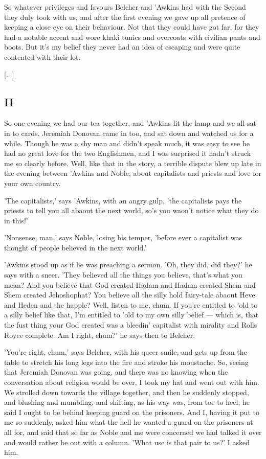 \documentclass[10pt,a4paper]{article}
\begin{document}
So whatever privileges and favours Belcher and 'Awkins had with the Second they duly took with us, and after the first evening we gave up all pretence of keeping a close eye on their behaviour. Not that they could have got far, for they had a notable accent and wore khaki tunics and overcoats with civilian pants and boots. But it's my belief they never had an idea of escaping and were quite contented with their lot. 

[...]

\subsection{II}

So one evening we had our tea together, and 'Awkins lit the lamp and we all sat in to cards. Jeremiah Donovan came in too, and sat down and watched us for a while. Though he was a shy man and didn't speak much, it was easy to see he had no great love for the two Englishmen, and I was surprised it hadn't struck me so clearly before. Well, like that in the story, a terrible dispute blew up late in the evening between 'Awkins and Noble, about capitalists and priests and love for your own country. 

'The capitalists,' says 'Awkins, with an angry gulp, 'the capitalists pays the priests to tell you all abaout the next world, so's you waon't notice what they do in this!' 

'Nonsense, man,' says Noble, losing his temper, 'before ever a capitalist was thought of people believed in the next world.' 

'Awkins stood up as if he was preaching a sermon. 'Oh, they did, did they?' he says with a sneer. 'They believed all the things you believe, that's what you mean? And you believe that God created Hadam and Hadam created Shem and Shem created Jehoshophat? You believe all the silly hold fairy-tale abaout Heve and Heden and the happle? Well, listen to me, chum. If you're entitled to 'old to a silly belief like that, I'm entitled to 'old to my own silly belief — which is, that the fust thing your God created was a bleedin' capitalist with mirality and Rolls Royce complete. Am I right, chum?' he says then to Belcher. 

'You're right, chum,' says Belcher, with his queer smile, and gets up from the table to stretch his long legs into the fire and stroke his moustache. So, seeing that Jeremiah Donovan was going, and there was no knowing when the conversation about religion would be over, I took my hat and went out with him. We strolled down towards the village together, and then he suddenly stopped, and blushing and mumbling, and shifting, as his way was, from toe to heel, he said I ought to be behind keeping guard on the prisoners. And I, having it put to me so suddenly, asked him what the hell he wanted a guard on the prisoners at all for, and said that so far as Noble and me were concerned we had talked it over and would rather be out with a column. 'What use is that pair to us?' I asked him. 
\end{document}
